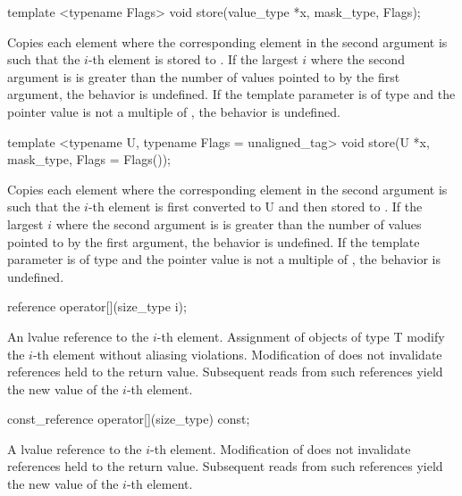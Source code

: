 \begin{wgText}
  \begin{itemdecl}
template <typename Flags> void store(value_type *x, mask_type, Flags);
  \end{itemdecl}
  \begin{itemdescr}
    \pnum\effects Copies each element where the corresponding element in the second argument is \true such that the $i$-th element is stored to .
    \pnum\remarks If the largest $i$ where the second argument is \true is greater than the number of values pointed to by the first argument, the behavior is undefined.
    \pnum         If the template parameter is of type  and the pointer value is not a multiple of , the behavior is undefined.
  \end{itemdescr}

  \begin{itemdecl}
template <typename U, typename Flags = unaligned_tag> void store(U *x, mask_type, Flags = Flags());
  \end{itemdecl}
  \begin{itemdescr}
    \pnum\effects Copies each element where the corresponding element in the second argument is \true such that the $i$-th element is first converted to \type U and then stored to .
    \pnum\remarks If the largest $i$ where the second argument is \true is greater than the number of values pointed to by the first argument, the behavior is undefined.
    \pnum         If the template parameter is of type  and the pointer value is not a multiple of , the behavior is undefined.
  \end{itemdescr}

  \begin{itemdecl}
reference operator[](size_type i);
  \end{itemdecl}
  \begin{itemdescr}
    \pnum\returns An lvalue reference to the $i$-th element.
    \pnum\postconditions Assignment of objects of type \type T modify the $i$-th element without aliasing violations.
    \pnum                Modification of  does not invalidate references held to the return value.
    Subsequent reads from such references yield the new value of the $i$-th element.
  \end{itemdescr}

  \begin{itemdecl}
const_reference operator[](size_type) const;
  \end{itemdecl}
  \begin{itemdescr}
    \pnum\returns A \const lvalue reference to the $i$-th element.
    \pnum\postconditions Modification of  does not invalidate references held to the return value.
    Subsequent reads from such references yield the new value of the $i$-th element.
  \end{itemdescr}


\end{wgText}
